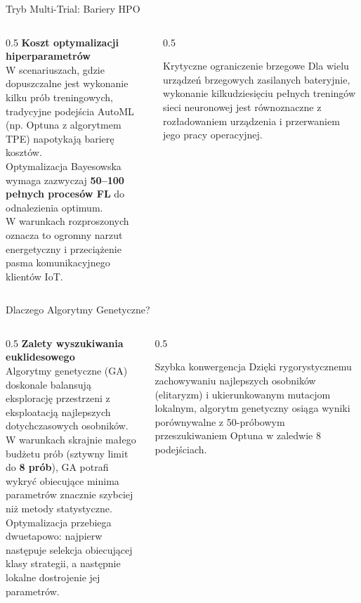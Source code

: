 \documentclass[9pt,aspectratio=169]{beamer}
\begin{document}
\begin{frame}{Tryb Multi-Trial: Bariery HPO}
\begin{columns}[T]
\begin{column}{0.5\textwidth}
\textbf{Koszt optymalizacji hiperparametrów}\\[4pt]
W scenariuszach, gdzie dopuszczalne jest wykonanie kilku prób treningowych, tradycyjne podejścia AutoML (np. Optuna z algorytmem TPE) napotykają barierę kosztów.\\[6pt]
Optymalizacja Bayesowska wymaga zazwyczaj \textbf{50--100 pełnych procesów FL} do odnalezienia optimum.\\[6pt]
W warunkach rozproszonych oznacza to ogromny narzut energetyczny i przeciążenie pasma komunikacyjnego klientów IoT.
\end{column}
\begin{column}{0.5\textwidth}
\begin{infoboxorange}{Krytyczne ograniczenie brzegowe}
Dla wielu urządzeń brzegowych zasilanych bateryjnie, wykonanie kilkudziesięciu pełnych treningów sieci neuronowej jest równoznaczne z rozładowaniem urządzenia i przerwaniem jego pracy operacyjnej.
\end{infoboxorange}
\end{column}
\end{columns}
\end{frame}

\begin{frame}{Dlaczego Algorytmy Genetyczne?}
\begin{columns}[T]
\begin{column}{0.5\textwidth}
\textbf{Zalety wyszukiwania euklidesowego}\\[4pt]
Algorytmy genetyczne (GA) doskonale balansują eksplorację przestrzeni z eksploatacją najlepszych dotychczasowych osobników.\\[6pt]
W warunkach skrajnie małego budżetu prób (sztywny limit do \textbf{8 prób}), GA potrafi wykryć obiecujące minima parametrów znacznie szybciej niż metody statystyczne.\\[6pt]
Optymalizacja przebiega dwuetapowo: najpierw następuje selekcja obiecującej klasy strategii, a następnie lokalne dostrojenie jej parametrów.
\end{column}
\begin{column}{0.5\textwidth}
\begin{infobox}{Szybka konwergencja}
Dzięki rygorystycznemu zachowywaniu najlepszych osobników (elitaryzm) i ukierunkowanym mutacjom lokalnym, algorytm genetyczny osiąga wyniki porównywalne z 50-próbowym przeszukiwaniem Optuna w zaledwie 8 podejściach.
\end{infobox}
\end{column}
\end{columns}
\end{frame}
\end{document}

